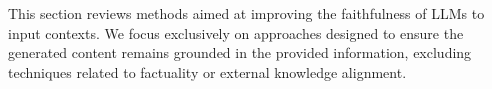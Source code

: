 This section reviews methods aimed at improving the faithfulness of LLMs to input contexts. We focus exclusively on approaches designed to ensure the generated content remains grounded in the provided information, excluding techniques related to factuality or external knowledge alignment.

